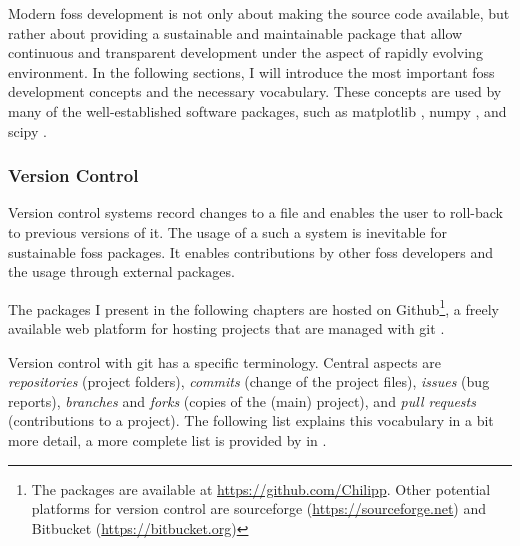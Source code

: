 \begin{refsection}
Modern \gls{foss} development is not only about making the source code available, but rather about providing a sustainable and maintainable package that allow continuous and transparent development under the aspect of rapidly evolving environment. In the following sections, I will introduce the most important \gls{foss} development concepts \citep[e.g.][]{StoddenMiguez2014, Shaw2018} and the necessary vocabulary. These concepts are used by many of the well-established software packages, such as matplotlib \citep{Hunter2007}, numpy \citep{Oliphant2006}, and scipy \citep{JonesOliphantPetersonEtAl2001}.

\subsubsection{Version Control} \label{sec:intro-software-github}
Version control systems record changes to a file and enables the user to roll-back to previous versions of it. The usage of a such a system is inevitable for sustainable \gls{foss} packages. It enables contributions by other \gls{foss} developers and the usage through external packages.

The packages I present in the following chapters are hosted on Github\footnote{The packages are available at \url{https://github.com/Chilipp}. Other potential platforms for version control are sourceforge (\url{https://sourceforge.net}) and Bitbucket (\url{https://bitbucket.org})}, a freely available web platform for hosting projects that are managed with git \citep{ChaconStraubPGC2019}.

Version control with git has a specific terminology. Central aspects are \textit{repositories} (project folders), \textit{commits} (change of the project files), \textit{issues} (bug reports), \textit{branches} and \textit{forks} (copies of the (main) project), and \textit{pull requests} (contributions to a project). The following list explains this vocabulary in a bit more detail, a more complete list is provided by in \cite{Github2019}.


\end{refsection}
